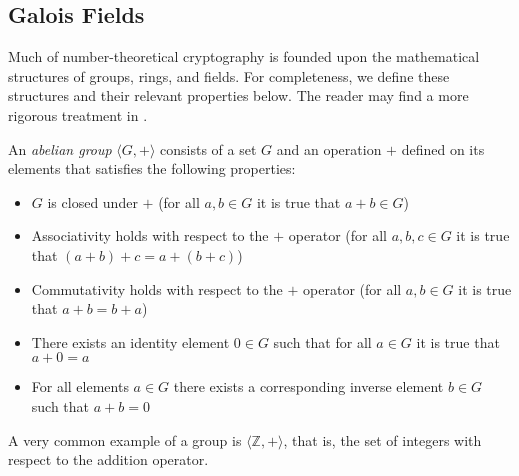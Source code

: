 
\subsection{Galois Fields}

Much of number-theoretical cryptography is founded upon the mathematical structures of groups, rings, and fields. For completeness, we define these structures and their relevant properties below. The reader may find a more rigorous treatment in \cite{Lidl94-1}.

\begin{definition}
An \emph{abelian group} $\langle G, + \rangle$ consists of a set $G$ and an operation $+$ defined on its elements that satisfies the following properties:
\begin{itemize}
	\item $G$ is closed under $+$ (for all $a,b \in G$ it is true that $a + b \in G$)
	\item Associativity holds with respect to the $+$ operator (for all $a, b, c \in G$ it is true that $(a + b) + c = a + (b + c)$)
	\item Commutativity holds with respect to the $+$ operator (for all $a, b \in G$ it is true that $a + b = b + a$)
	\item There exists an identity element $0 \in G$ such that for all $a \in G$ it is true that $a + 0 = a$
	\item For all elements $a \in G$ there exists a corresponding inverse element $b \in G$ such that $a + b = 0$
\end{itemize}
\end{definition}

A very common example of a group is $\langle \mathbb{Z}, + \rangle$, that is, the set of integers with respect to the addition operator.

